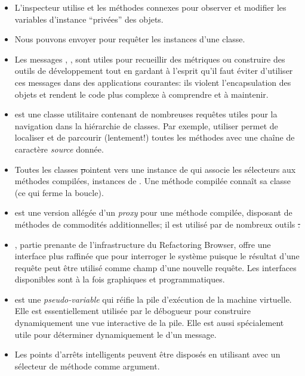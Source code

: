 \documentclass[a4paper,10pt,twoside]{book}
\begin{document}
\begin{itemize}
\item L'inspecteur utilise  et les méthodes connexes pour observer et modifier les variables d'instance ``privées'' des objets.
\item Nous pouvons envoyer  pour requêter les instances d'une classe.
\item Les messages , , \etc sont utiles pour recueillir des métriques ou construire des outils de développement tout en gardant à l'esprit qu'il faut éviter d'utiliser ces messages dans des applications courantes: ils violent l'encapsulation des objets et rendent le code plus complexe à comprendre et à maintenir.
\item {} est une classe utilitaire contenant de nombreuses requêtes utiles pour la navigation dans la hiérarchie de classes. Par exemple, utiliser  permet de localiser et de parcourir (lentement!) toutes les méthodes avec une chaîne de caractère \emph{source} donnée.
\item Toutes les classes \st pointent vers une instance de  qui associe les sélecteurs aux méthodes compilées, instances de . Une méthode compilée connaît sa classe (ce qui ferme la boucle).
\item {} est une version allégée d'un \emph{proxy} pour une méthode compilée, disposant de méthodes de commodités additionnelles; il est utilisé par de nombreux outils \st.
\item {}, partie prenante de l'infrastructure du Refactoring Browser, offre une interface plus raffinée que  pour interroger le système puisque le résultat d'une requête peut être utilisé comme champ d'une nouvelle requête. Les interfaces disponibles sont à la fois graphiques et programmatiques.
\item {} est une \emph{pseudo-variable} qui réifie la pile d'exécution de la machine virtuelle. Elle est essentiellement utilisée par le débogueur pour construire dynamiquement une vue interactive de la pile. Elle est aussi spécialement utile pour déterminer dynamiquement le \sender d'un message.
\item Les points d'arrêts intelligents peuvent être disposés en utilisant  avec un sélecteur de méthode comme argument.

\end{itemize}
\end{document}
